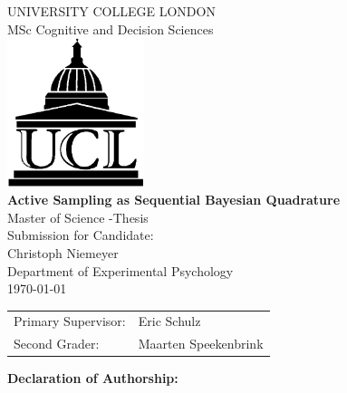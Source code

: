 \documentclass[oneside, 11pt]{book}
\begin{document}
\newcommand{\hmwkCourse}{MSc Cognitive and Decision Sciences\vspace{18mm}}
\newcommand{\hmwkTitle}{{\bf Active Sampling as Sequential Bayesian Quadrature} \vspace{18mm} \\ 
Master of Science -Thesis}
\newcommand{\hmwkSubTitle}{} %
\newcommand{\hmwkDueDate}{\today}
\newcommand{\hmwkClassInstructor}{}
\newcommand{\hmwkAuthorName}{Christoph Niemeyer}
\newcommand{\LastPage}{TBA}

\begin{titlepage}
\vspace{20mm}
\begin{center}
\vspace{150mm}
\LARGE{ UNIVERSITY COLLEGE LONDON \\ \hmwkCourse \\[6.5cm]
\includegraphics[width=4cm]{ucl.jpg}\\
\vspace{-110mm}
 {\hmwkTitle}  \\}
\vspace{80mm}
\Large Submission for Candidate:\\
Christoph Niemeyer\\
Department of Experimental Psychology
\\
\Large \today\vspace{28mm} \\ 
\begin{tabular}{ll}
Primary Supervisor:&Eric Schulz\\
Second Grader: &Maarten Speekenbrink
\end{tabular}
\end{center}
\end{titlepage}
\vspace*{1cm}
\begin{center}
\textbf{{\LARGE Declaration of Authorship:}}\\
\end{center}
\vspace{1cm}
\end{document}
